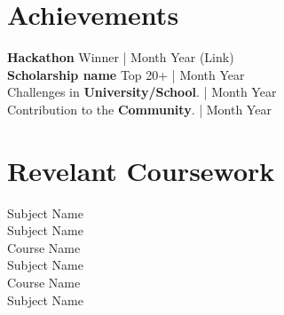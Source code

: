 \documentclass[a4paper, 11pt]{article} %
\begin{document}
\begin{bgbox}[height=\paperheight,colback=SwishLineColour, coltext=white,
width=0.33\textwidth,rightrule=1pt,colframe=SwishLineColour]
\section*{Achievements}
\vspace{-8pt}
  \textbf{Hackathon}  Winner | Month Year (Link) \vspace{8pt} \\
  \textbf{Scholarship name} Top 20+ | Month Year \vspace{8pt} \\
  Challenges in \textbf{University/School}. | Month Year \vspace{8pt} \\
  Contribution to the \textbf{Community}. | Month Year
\vspace{16pt}

\section*{Revelant Coursework}
\vspace{-8pt}
Subject Name \vspace{2pt} \\
Subject Name \vspace{2pt} \\
Course Name \vspace{2pt} \\
Subject Name \vspace{2pt} \\
Course Name \vspace{2pt} \\
Subject Name


\end{bgbox} %
\end{document}
